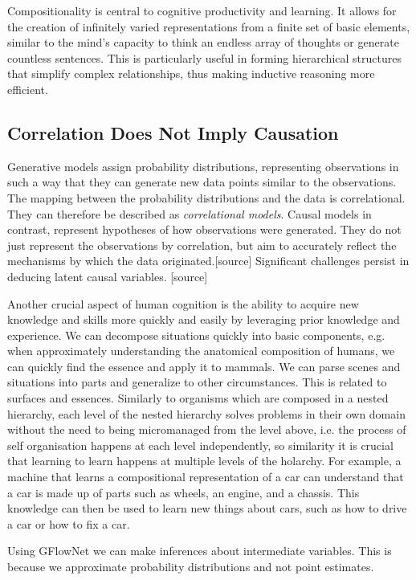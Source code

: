 Compositionality is central to cognitive productivity and learning. It allows for the creation of infinitely varied representations from a finite set of basic elements, similar to the mind's capacity to think an endless array of thoughts or generate countless sentences. This is particularly useful in forming hierarchical structures that simplify complex relationships, thus making inductive reasoning more efficient.



\subsection{Correlation Does Not Imply Causation}

Generative models assign probability distributions, representing observations in such a way that they can generate new data points similar to the observations. The mapping between the probability distributions and the data is correlational. They can therefore be described as \textit{correlational models}.
Causal models in contrast, represent hypotheses of how observations were generated. They do not just represent the observations by correlation, but aim to accurately reflect the mechanisms by  which the data originated.[source]
Significant challenges persist in deducing latent causal variables. [source]

Another crucial aspect of human cognition is the ability to acquire new knowledge and skills more quickly and easily by leveraging prior knowledge and experience. We can decompose situations quickly into basic components, e.g. when approximately understanding the anatomical composition of humans, we can quickly find the essence and apply it to mammals. We can parse scenes and situations into parts and generalize to other circumstances. 
This is related to surfaces and essences. 
Similarly to organisms which are composed in a nested hierarchy, each level of the nested hierarchy solves problems in their own domain without the need to being micromanaged from the level above, i.e. the process of self organisation happens at each level independently, so similarity it is crucial that learning to learn happens at multiple levels of the holarchy. 
For example, a machine that learns a compositional representation of a car can understand that a car is made up of parts such as wheels, an engine, and a chassis. This knowledge can then be used to learn new things about cars, such as how to drive a car or how to fix a car.

Using GFlowNet we can make inferences about intermediate variables. This is because we approximate probability distributions and not point estimates.


